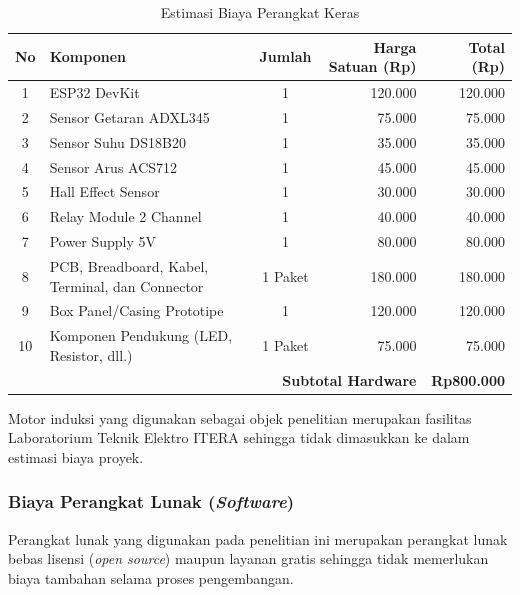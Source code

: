 \documentclass{elsinta}
\begin{document}
\begin{table}[H]
\centering
\caption{Estimasi Biaya Perangkat Keras}
\label{tab:harga}

\begin{tabular}{|c|p{5.8cm}|c|r|r|}
\hline
\textbf{No} &
\centering\textbf{Komponen} &
\textbf{Jumlah} &
\textbf{Harga Satuan (Rp)} &
\textbf{Total (Rp)}\\
\hline

1 & ESP32 DevKit & 1 & 120.000 & 120.000\\
\hline
2 & Sensor Getaran ADXL345 & 1 & 75.000 & 75.000\\
\hline
3 & Sensor Suhu DS18B20 & 1 & 35.000 & 35.000\\
\hline
4 & Sensor Arus ACS712 & 1 & 45.000 & 45.000\\
\hline
5 & Hall Effect Sensor & 1 & 30.000 & 30.000\\
\hline
6 & Relay Module 2 Channel & 1 & 40.000 & 40.000\\
\hline
7 & Power Supply 5V & 1 & 80.000 & 80.000\\
\hline
8 & PCB, Breadboard, Kabel, Terminal, dan Connector & 1 Paket & 180.000 & 180.000\\
\hline
9 & Box Panel/Casing Prototipe & 1 & 120.000 & 120.000\\
\hline
10 & Komponen Pendukung (LED, Resistor, dll.) & 1 Paket & 75.000 & 75.000\\
\hline

\multicolumn{4}{|r|}{\textbf{Subtotal Hardware}} &
\textbf{Rp800.000}\\
\hline

\end{tabular}
\end{table}

Motor induksi yang digunakan sebagai objek penelitian merupakan fasilitas Laboratorium Teknik Elektro ITERA sehingga tidak dimasukkan ke dalam estimasi biaya proyek.


\subsubsection{Biaya Perangkat Lunak (\textit{Software})}

Perangkat lunak yang digunakan pada penelitian ini merupakan perangkat lunak bebas lisensi (\textit{open source}) maupun layanan gratis sehingga tidak memerlukan biaya tambahan selama proses pengembangan.
\end{document}
